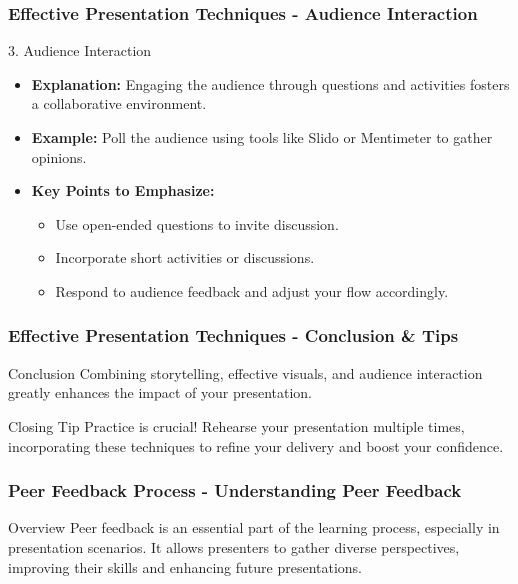 \documentclass[aspectratio=169]{beamer}
\begin{document}
\begin{frame}[fragile]
    \frametitle{Effective Presentation Techniques - Audience Interaction}
    \begin{block}{3. Audience Interaction}
        \begin{itemize}
            \item \textbf{Explanation:} Engaging the audience through questions and activities fosters a collaborative environment.
            \item \textbf{Example:} Poll the audience using tools like Slido or Mentimeter to gather opinions.
            \item \textbf{Key Points to Emphasize:}
            \begin{itemize}
                \item Use open-ended questions to invite discussion.
                \item Incorporate short activities or discussions.
                \item Respond to audience feedback and adjust your flow accordingly.
            \end{itemize}
        \end{itemize}
    \end{block}
\end{frame}

\begin{frame}[fragile]
    \frametitle{Effective Presentation Techniques - Conclusion & Tips}
    \begin{block}{Conclusion}
        Combining storytelling, effective visuals, and audience interaction greatly enhances the impact of your presentation.
    \end{block}
    \begin{block}{Closing Tip}
        Practice is crucial! Rehearse your presentation multiple times, incorporating these techniques to refine your delivery and boost your confidence.
    \end{block}
\end{frame}

\begin{frame}[fragile]
    \frametitle{Peer Feedback Process - Understanding Peer Feedback}
    \begin{block}{Overview}
        Peer feedback is an essential part of the learning process, especially in presentation scenarios. 
        It allows presenters to gather diverse perspectives, improving their skills and enhancing future presentations.
    \end{block}
\end{frame}
\end{document}
